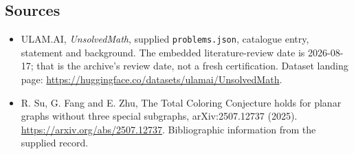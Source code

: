 \documentclass[11pt,a4paper]{article}
\begin{document}
\subsection{Sources}

{\small

\begin{itemize}

\item[\hypertarget{source:statement:1}{S1}] ULAM.AI, \emph{UnsolvedMath}, supplied \texttt{problems.json}, catalogue entry, statement and background. The embedded literature-review date is 2026-08-17; that is the archive’s review date, not a fresh certification. Dataset landing page: \url{https://huggingface.co/datasets/ulamai/UnsolvedMath}.

\item[\hypertarget{source:statement:2}{S2}] R. Su, G. Fang and E. Zhu, The Total Coloring Conjecture holds for planar graphs without three special subgraphs, arXiv:2507.12737 (2025). \url{https://arxiv.org/abs/2507.12737}. Bibliographic information from the supplied record.

\end{itemize}

}

\label{end:statement}
\end{document}
